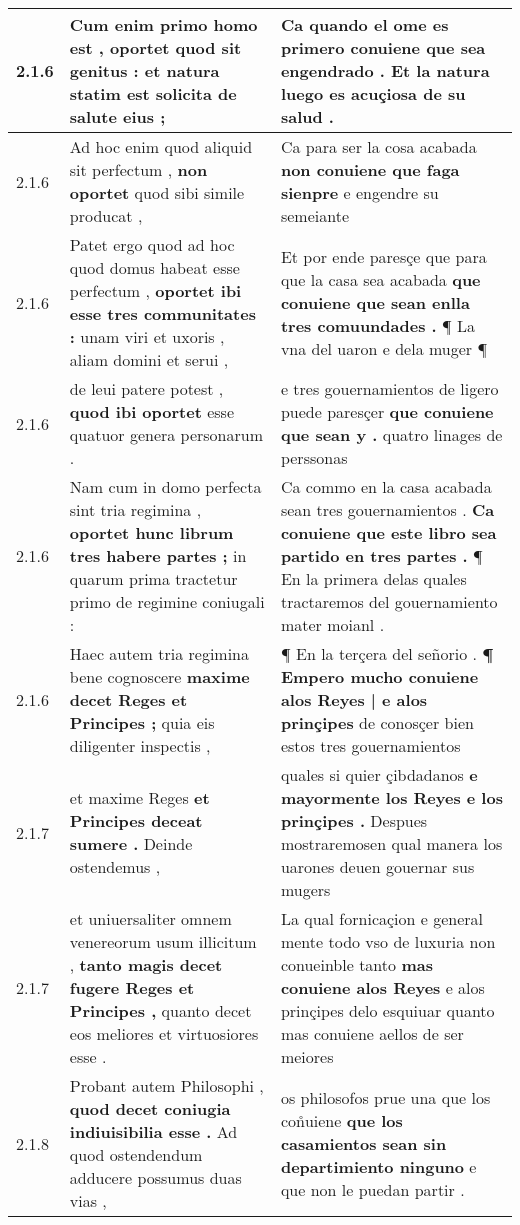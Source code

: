 \begin{tabular}{|p{1cm}|p{6.5cm}|p{6.5cm}|}
2.1.6 & Cum enim primo homo est , \textbf{ oportet quod sit genitus : } et natura statim est solicita de salute eius ; & Ca quando el ome es primero \textbf{ conuiene que sea engendrado . } Et la natura luego es acuçiosa de su salud . \\\hline
2.1.6 & Ad hoc enim quod aliquid sit perfectum , \textbf{ non oportet } quod sibi simile producat , & Ca para ser la cosa acabada \textbf{ non conuiene que faga sienpre } e engendre su semeiante \\\hline
2.1.6 & Patet ergo quod ad hoc quod domus habeat esse perfectum , \textbf{ oportet ibi esse tres communitates : } unam viri et uxoris , aliam domini et serui , & Et por ende paresçe que para que la casa sea acabada \textbf{ que conuiene que sean enlla tres comuundades . } ¶ La vna del uaron e dela muger ¶ \\\hline
2.1.6 & de leui patere potest , \textbf{ quod ibi oportet } esse quatuor genera personarum . & e tres gouernamientos de ligero puede paresçer \textbf{ que conuiene que sean y . } quatro linages de perssonas \\\hline
2.1.6 & Nam cum in domo perfecta sint tria regimina , \textbf{ oportet hunc librum tres habere partes ; } in quarum prima tractetur primo de regimine coniugali : & Ca commo en la casa acabada sean tres gouernamientos . \textbf{ Ca conuiene que este libro sea partido en tres partes . } ¶ En la primera delas quales tractaremos del gouernamiento mater moianl . \\\hline
2.1.6 & Haec autem tria regimina bene cognoscere \textbf{ maxime decet Reges et Principes ; } quia eis diligenter inspectis , & ¶ En la terçera del señorio . \textbf{ ¶ Empero mucho conuiene alos Reyes | e alos prinçipes } de conosçer bien estos tres gouernamientos \\\hline
2.1.7 & et maxime Reges \textbf{ et Principes deceat sumere . } Deinde ostendemus , & quales si quier çibdadanos \textbf{ e mayormente los Reyes e los prinçipes . } Despues mostraremosen qual manera los uarones deuen gouernar sus mugers \\\hline
2.1.7 & et uniuersaliter omnem venereorum usum illicitum , \textbf{ tanto magis decet fugere Reges et Principes , } quanto decet eos meliores et virtuosiores esse . & La qual fornicaçion e general mente todo vso de luxuria non conueinble tanto \textbf{ mas conuiene alos Reyes } e alos prinçipes delo esquiuar quanto mas conuiene aellos de ser meiores \\\hline
2.1.8 & Probant autem Philosophi , \textbf{ quod decet coniugia indiuisibilia esse . } Ad quod ostendendum adducere possumus duas vias , & os philosofos prue una que los con̊uiene \textbf{ que los casamientos sean sin departimiento ninguno } e que non le puedan partir . \\\hline

\end{tabular}
